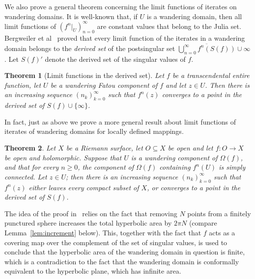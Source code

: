 \documentclass[12pt,a4paper,reqno]{amsart}
\theoremstyle{plain}
\newtheorem{thm}{Theorem}[section]
\renewcommand{\subset}{\subseteq}
\theoremstyle{definition}
\theoremstyle{remark}
\newtheorem{rmk}[thm]{Remark}
\numberwithin{equation}{section}
\newcommand*{\defeq}{\mathrel{\vcenter{\baselineskip0.5ex \lineskiplimit0pt
                     \hbox{\scriptsize.}\hbox{\scriptsize.}}}%
                     =}
\begin{document}
{We also prove a general theorem concerning the limit
functions of iterates on wandering domains. It is well-known that, if $U$ is a wandering domain, then all limit functions
of $(f^n|_U)_{n=0}^{\infty}$ are constant values that belong to the Julia set. Bergweiler et al~\cite{bergweiler-haruta-kriete-meier-terglane93} proved
that every limit function of the iterates in a wandering domain belongs to the
\emph{derived set} of the postsingular set 
 $\overline{\bigcup_{n=0}^\infty f^n(S(f))}\cup \infty$. Let $S(f)'$ denote the derived set of the singular values of $f$.
 \begin{thm}[Limit functions in the derived set]\label{thm:derivedset}
     Let $f$ be a transcendental entire function, let $U$ be a wandering Fatou component of $f$
      and let $z\in U$. Then there is an increasing sequence $(n_k)_{k=0}^{\infty}$ such that
      $f^n(z)$ converges to a point in the derived set
        of $S(f)\cup \{\infty\}$. 
 \end{thm}
In fact, just as above we prove a more general result about limit functions of iterates of wandering domains  for locally defined mappings.
\begin{thm}
Let $X$ be a Riemann surface, let $O\subset X$ be open and let
  $f\colon O\to X$ be open and holomorphic. Suppose that $U$ is a wandering component
   of $\Omega(f)$, and that for every $n\geq 0$, the component of $\Omega(f)$ containing
   $f^n(U)$ is simply connected. %
   Let $z\in U$; then there is an increasing sequence $(n_k)_{k=0}^{\infty}$ such that
      $f^n(z)$ either leaves every compact subset of $X$, 
       or converges to a point in  the derived set
       of $S(f)$. 
  \end{thm}}


The idea of the proof in~\cite{ye26} relies on the fact that removing $N$ points from 
 a finitely punctured sphere increases the total hyperbolic area by $2\pi N$
 (compare Lemma~\ref{lem:increment}
 below). This, together with the fact that $f$ acts as a covering map over the complement
 of the set of 
 singular values, is used to conclude that the hyperbolic area of the wandering domain
 in question is finite, which is a contradiction to the fact that the wandering domain
 is conformally equivalent to the hyperbolic plane, which has infinite area.
\end{document}
